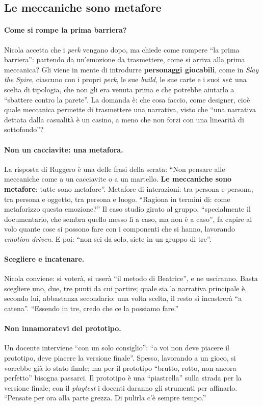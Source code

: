 \subsection{Le meccaniche sono metafore}

\paragraph{Come si rompe la prima barriera?} Nicola accetta che i \emph{perk} vengano dopo,
ma chiede come rompere ``la prima barriera'': partendo da un'emozione da trasmettere, come
si arriva alla prima meccanica? Gli viene in mente di introdurre \textbf{personaggi
giocabili}, come in \emph{Slay the Spire}, ciascuno con i propri \emph{perk}, le sue
\emph{build}, le sue carte e i suoi \emph{set}: una scelta di tipologia, che non gli era
venuta prima e che potrebbe aiutarlo a ``sbattere contro la parete''. La domanda è: che
cosa faccio, come designer, cioè quale meccanica permette di trasmettere una narrativa,
visto che ``una narrativa dettata dalla casualità è un casino, a meno che non forzi con
una linearità di sottofondo''?

\paragraph{Non un cacciavite: una metafora.} La risposta di Ruggero è una delle frasi della
serata: ``Non pensare alle meccaniche come a un cacciavite o a un martello. \textbf{Le
meccaniche sono metafore}: tutte sono metafore''. Metafore di interazioni: tra persona e
persona, tra persona e oggetto, tra persona e luogo. ``Ragiona in termini di: come
metaforizzo questa emozione?'' Il caso studio girato al gruppo, ``specialmente il
documentario, che sembra quello messo lì a caso, ma non è a caso'', fa capire al volo
quante cose si possono fare con i componenti che si hanno, lavorando \emph{emotion
driven}. E poi: ``non sei da solo, siete in un gruppo di tre''.

\paragraph{Scegliere e incatenare.} Nicola conviene: si voterà, si userà ``il metodo di
Beatrice'', e ne usciranno. Basta scegliere uno, due, tre punti da cui partire; quale sia
la narrativa principale è, secondo lui, abbastanza secondario: una volta scelta, il resto
si incastrerà ``a catena''. ``Essendo in tre, credo che ce la possiamo fare.''

\paragraph{Non innamoratevi del prototipo.} Un docente interviene ``con un solo
consiglio'': ``a voi non deve piacere il prototipo, deve piacere la versione finale''.
Spesso, lavorando a un gioco, si vorrebbe già lo stato finale; ma per il prototipo
``brutto, rotto, non ancora perfetto'' bisogna passarci. Il prototipo è una
``piastrella'' sulla strada per la versione finale; con il \emph{playtest} i docenti
daranno gli strumenti per affinarlo. ``Pensate per ora alla parte grezza. Di pulirla c'è
sempre tempo.''


